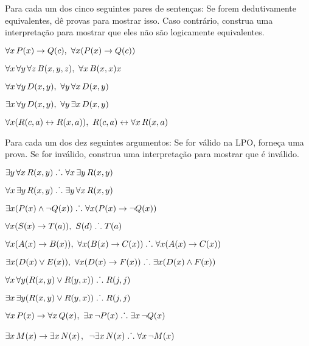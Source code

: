 \solutions
\problempart
\label{pr.FOLequivornot}
Para cada um dos cinco seguintes pares de sentenças: Se forem dedutivamente equivalentes, dê provas para mostrar isso. Caso contrário, construa uma interpretação para mostrar que eles não são logicamente equivalentes.
\begin{earg}
\item $\forall x\,\mathord{P}(x) \rightarrow \mathord{Q}(c),\,\, \forall x (\mathord{P}(x) \rightarrow \mathord{Q}(c))$
\item $\forall x\,\forall y\, \forall z\,\mathord{B}(x,y,z),\,\, \forall x\,\mathord{B}(x,x)x$
\item $\forall x\,\forall y\,\mathord{D}(x,y),\,\, \forall y\,\forall x\,\mathord{D}(x,y)$
\item $\exists x\,\forall y\,\mathord{D}(x,y),\,\, \forall y\,\exists x\,\mathord{D}(x,y)$
\item $\forall x (\mathord{R}(c,a) \leftrightarrow \mathord{R}(x,a)),\,\, \mathord{R}(c,a) \leftrightarrow \forall x\,\mathord{R}(x,a)$
\end{earg}

\solutions
\problempart
\label{pr.FOLvalidornot}
Para cada um dos dez seguintes argumentos: Se for válido na LPO, forneça uma prova. Se for inválido, construa uma interpretação para mostrar que é inválido.
\begin{earg}
\item $\exists y\,\forall x\,\mathord{R}(x,y) \mathrel{\ldotp\dot{}\,\ldotp} \forall x\,\exists y\,\mathord{R}(x,y)$
\item $\forall x\,\exists y\,\mathord{R}(x,y) \mathrel{\ldotp\dot{}\,\ldotp}  \exists y\,\forall x\,\mathord{R}(x,y)$
\item $\exists x(\mathord{P}(x) \wedge \neg \mathord{Q}(x)) \mathrel{\ldotp\dot{}\,\ldotp} \forall x(\mathord{P}(x) \rightarrow \neg \mathord{Q}(x))$
\item $\forall x(\mathord{S}(x) \rightarrow \mathord{T}(a)),\,\, \mathord{S}(d) \mathrel{\ldotp\dot{}\,\ldotp} \mathord{T}(a)$
\item $\forall x(\mathord{A}(x)\rightarrow \mathord{B}(x)),\,\, \forall x(\mathord{B}(x) \rightarrow \mathord{C}(x)) \mathrel{\ldotp\dot{}\,\ldotp} \forall x(\mathord{A}(x) \rightarrow \mathord{C}(x))$
\item $\exists x(\mathord{D}(x) \vee \mathord{E}(x)),\,\, \forall x(\mathord{D}(x) \rightarrow \mathord{F}(x)) \mathrel{\ldotp\dot{}\,\ldotp} \exists x(\mathord{D}(x) \wedge \mathord{F}(x))$
\item $\forall x\,\forall y(\mathord{R}(x,y) \vee \mathord{R}(y,x)) \mathrel{\ldotp\dot{}\,\ldotp} \mathord{R}(j,j)$
\item $\exists x\,\exists y(\mathord{R}(x,y) \vee \mathord{R}(y,x)) \mathrel{\ldotp\dot{}\,\ldotp} \mathord{R}(j,j)$
\item $\forall x\,\mathord{P}(x) \rightarrow \forall x\,\mathord{Q}(x),\,\, \exists x\, \neg\mathord{P}(x) \mathrel{\ldotp\dot{}\,\ldotp} \exists x\, \neg \mathord{Q}(x)$
\item $\exists x\,\mathord{M}(x) \rightarrow \exists x\,\mathord{N}(x)$,\,\, $\neg \exists x\,\mathord{N}(x)\mathrel{\ldotp\dot{}\,\ldotp}  \forall x\, \neg \mathord{M}(x)$
\end{earg}

